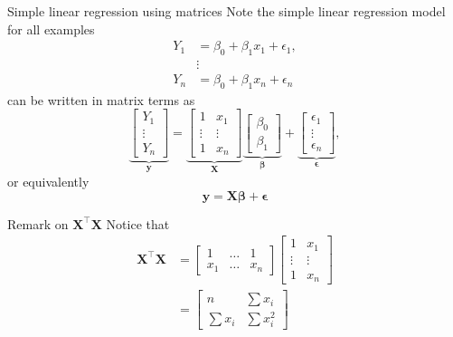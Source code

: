 \documentclass{beamer}
\begin{document}
\begin{frame}{Simple linear regression using matrices}
Note the simple linear regression model for all examples
\begin{align*}
    Y_1&=\beta_0 + \beta_1x_1+\epsilon_1,\\
    &\vdots\\
    Y_n&=\beta_0+\beta_1x_n+\epsilon_n
\end{align*}
can be written in matrix terms as
$$
\underbrace{\begin{bmatrix}
Y_1\\
\vdots\\
Y_n
\end{bmatrix}}_{\mathbf{y}}=
\underbrace{\begin{bmatrix}
1 & x_1\\
\vdots & \vdots\\
1 & x_n
\end{bmatrix}}_{\mathbf{X}}
\underbrace{\begin{bmatrix}
\beta_0\\
\beta_1
\end{bmatrix}}_{\boldsymbol\beta}
+\underbrace{\begin{bmatrix}
\epsilon_1\\
\vdots\\
\epsilon_n
\end{bmatrix}}_{\boldsymbol\epsilon},
$$
or equivalently
$$
\mathbf{y}=\mathbf{X}\boldsymbol{\beta}+\boldsymbol{\epsilon}
$$
\end{frame}

\begin{frame}{Remark on $\mathbf{X}^\top\mathbf{X}$}
Notice that
\begin{align*}
    \mathbf{X}^\top\mathbf{X}&=
    \begin{bmatrix}
    1 & \ldots & 1\\
    x_1 & \ldots & x_n
    \end{bmatrix}\begin{bmatrix}
    1 & x_1\\
    \vdots & \vdots\\
    1 & x_n
    \end{bmatrix}\\
    &=\begin{bmatrix}
    n & \sum x_i\\
    \sum x_i & \sum x_i^2
    \end{bmatrix}
\end{align*}
\end{frame}
\end{document}
